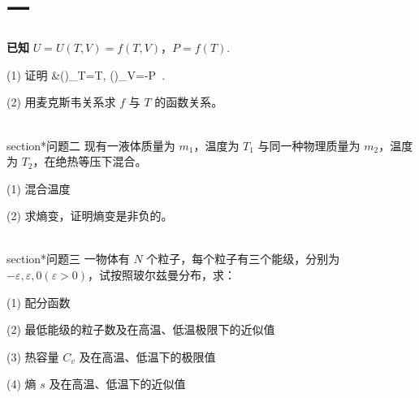 \section{一}\textbf{已知} $U = U(T, V) = f(T, V)$，$P = f(T)$.

(1) 证明
&\left(\right)_T=T, \left(\right)_V=-P~.

(2) 用麦克斯韦关系求 $f$ 与 $T$ 的函数关系。

\\section*{问题二}
现有一液体质量为 $m_1$，温度为 $T_1$ 与同一种物理质量为 $m_2$，温度为 $T_2$，在绝热等压下混合。

(1) 混合温度

(2) 求熵变，证明熵变是非负的。

\\section*{问题三}
一物体有 $N$ 个粒子，每个粒子有三个能级，分别为 $-\varepsilon, \varepsilon, 0 (\varepsilon > 0)$，试按照玻尔兹曼分布，求：

(1) 配分函数

(2) 最低能级的粒子数及在高温、低温极限下的近似值

(3) 热容量 $C_v$ 及在高温、低温下的极限值

(4) 熵 $s$ 及在高温、低温下的近似值

